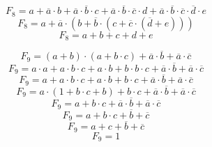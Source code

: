 \documentclass{article}
\begin{document}
\begin{multicols}{2}
\[ F_8 = a + \overline{a} \cdot b + \overline{a} \cdot \overline{b} \cdot c + \overline{a} \cdot \overline{b}\cdot \overline{c} \cdot d  + \overline{a} \cdot \overline{b}\cdot \overline{c} \cdot \overline{d}  \cdot e \]
\[ F_8 = a + \overline{a} \cdot (b + \overline{b} \cdot (c + \overline{c} \cdot (\overline{d} + e))) \]
\[ F_8 = a + b + c + d + e \]


\[ F_9 = (a + b) \cdot (a + b \cdot c) + \overline{a} \cdot \overline{b} + \overline{a} \cdot \overline{c} \]
\[ F_9 = a \cdot a + a \cdot b \cdot c + a \cdot b + b \cdot b \cdot c + \overline{a} \cdot \overline{b} + \overline{a} \cdot \overline{c}\]
\[ F_9 = a + a \cdot  b \cdot c + a \cdot b + b \cdot c  + \overline{a} \cdot \overline{b} + \overline{a} \cdot \overline{c} \]
\[ F_9 = a \cdot (1 + b \cdot c+ b) + b \cdot c  + \overline{a} \cdot \overline{b} + \overline{a} \cdot \overline{c} \]
\[ F_9 = a + b \cdot c + \overline{a} \cdot \overline{b} + \overline{a} \cdot \overline{c}\]
\[ F_9 = a + b \cdot c + \overline{b} + \overline{c} \]
\[ F_9 = a + c + \overline{b} + \overline{c} \]
\[ F_9 = 1 \]

\end{multicols}
\end{document}
